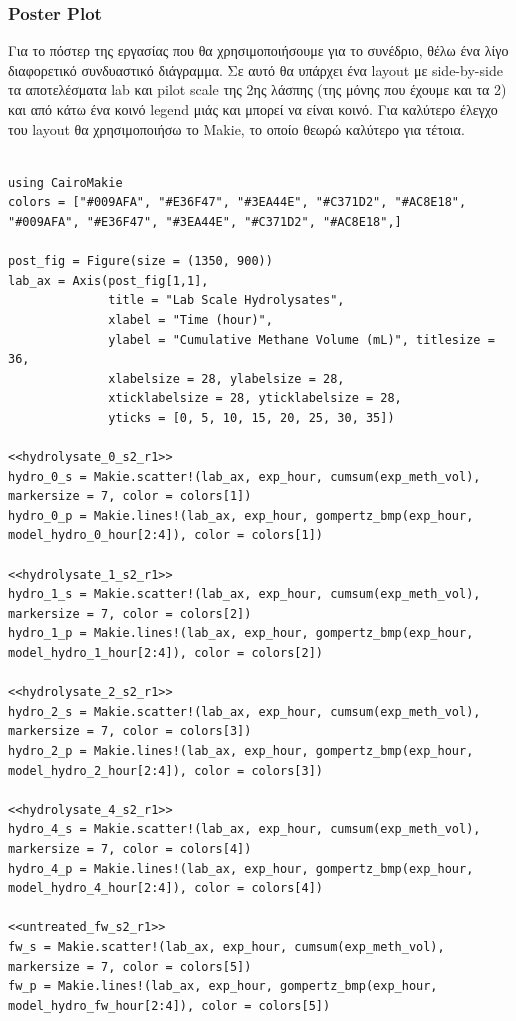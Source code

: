 \documentclass[11pt]{article}
\begin{document}
\subsubsection{Poster Plot}
\label{sec:org24726b6}
Για το πόστερ της εργασίας που θα χρησιμοποιήσουμε για το συνέδριο, θέλω ένα λίγο διαφορετικό συνδυαστικό διάγραμμα. Σε αυτό θα υπάρχει ένα layout με side-by-side τα αποτελέσματα lab και pilot scale της 2ης λάσπης (της μόνης που έχουμε και τα 2) και από κάτω ένα κοινό legend μιάς και μπορεί να είναι κοινό. Για καλύτερο έλεγχο του layout θα χρησιμοποιήσω το Makie, το οποίο θεωρώ καλύτερο για τέτοια.

\begin{verbatim}

using CairoMakie
colors = ["#009AFA", "#E36F47", "#3EA44E", "#C371D2", "#AC8E18", "#009AFA", "#E36F47", "#3EA44E", "#C371D2", "#AC8E18",]

post_fig = Figure(size = (1350, 900))
lab_ax = Axis(post_fig[1,1],
              title = "Lab Scale Hydrolysates",
              xlabel = "Time (hour)",
              ylabel = "Cumulative Methane Volume (mL)", titlesize = 36,
              xlabelsize = 28, ylabelsize = 28,
              xticklabelsize = 28, yticklabelsize = 28,
              yticks = [0, 5, 10, 15, 20, 25, 30, 35])

<<hydrolysate_0_s2_r1>>
hydro_0_s = Makie.scatter!(lab_ax, exp_hour, cumsum(exp_meth_vol), markersize = 7, color = colors[1])
hydro_0_p = Makie.lines!(lab_ax, exp_hour, gompertz_bmp(exp_hour, model_hydro_0_hour[2:4]), color = colors[1])

<<hydrolysate_1_s2_r1>>
hydro_1_s = Makie.scatter!(lab_ax, exp_hour, cumsum(exp_meth_vol), markersize = 7, color = colors[2])
hydro_1_p = Makie.lines!(lab_ax, exp_hour, gompertz_bmp(exp_hour, model_hydro_1_hour[2:4]), color = colors[2])

<<hydrolysate_2_s2_r1>>
hydro_2_s = Makie.scatter!(lab_ax, exp_hour, cumsum(exp_meth_vol), markersize = 7, color = colors[3])
hydro_2_p = Makie.lines!(lab_ax, exp_hour, gompertz_bmp(exp_hour, model_hydro_2_hour[2:4]), color = colors[3])

<<hydrolysate_4_s2_r1>>
hydro_4_s = Makie.scatter!(lab_ax, exp_hour, cumsum(exp_meth_vol), markersize = 7, color = colors[4])
hydro_4_p = Makie.lines!(lab_ax, exp_hour, gompertz_bmp(exp_hour, model_hydro_4_hour[2:4]), color = colors[4])

<<untreated_fw_s2_r1>>
fw_s = Makie.scatter!(lab_ax, exp_hour, cumsum(exp_meth_vol), markersize = 7, color = colors[5])
fw_p = Makie.lines!(lab_ax, exp_hour, gompertz_bmp(exp_hour, model_hydro_fw_hour[2:4]), color = colors[5])


\end{verbatim}
\end{document}
